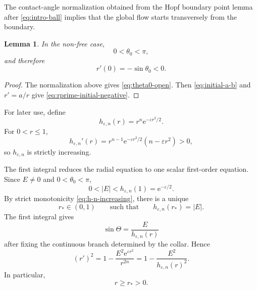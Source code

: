 \documentclass[11pt,a4paper]{article}
\numberwithin{equation}{section}
\newtheorem{lemma}[theorem]{Lemma}
\newcommand{\ee}{\mathrm e}
\begin{document}
The contact-angle normalization obtained from the Hopf boundary point lemma
after \eqref{eq:intro-ball} implies that the global flow starts transversely
from the boundary.

\begin{lemma}\label{lem:no-zero-angle}
In the non-free case,
\begin{equation}\label{eq:theta0-open}
        0<\theta_0<\pi,
\end{equation}
and therefore
\begin{equation}\label{eq:rprime-initial-negative}
        r'(0)=-\sin\theta_0<0.
\end{equation}
\end{lemma}

\begin{proof}
The normalization above gives \eqref{eq:theta0-open}.  Then
\eqref{eq:initial-a-b} and $r'=a/r$ give
\eqref{eq:rprime-initial-negative}.
\end{proof}

For later use, define
\begin{equation*}
        h_{\varepsilon,n}(r)=r^n\ee^{-\varepsilon r^2/2}.
\end{equation*}
For $0<r\le1$,
\begin{equation}\label{eq:h-n-increasing}
        h_{\varepsilon,n}'(r)=r^{n-1}\ee^{-\varepsilon r^2/2}(n-\varepsilon r^2)>0,
\end{equation}
so $h_{\varepsilon,n}$ is strictly increasing.

The first integral reduces the radial equation to one scalar first-order equation.
Since $E\ne0$ and $0<\theta_0<\pi$,
\begin{equation*}
        0<|E|<h_{\varepsilon,n}(1)=\ee^{-\varepsilon/2}.
\end{equation*}
By strict monotonicity \eqref{eq:h-n-increasing}, there is a unique
\begin{equation*}
        r_*\in(0,1)
        \qquad\text{such that}\qquad
        h_{\varepsilon,n}(r_*)=|E|.
\end{equation*}
The first integral gives
\begin{equation*}
        \sin\Theta=\frac{E}{h_{\varepsilon,n}(r)}
\end{equation*}
after fixing the continuous branch determined by the collar.  Hence
\begin{equation}\label{eq:r-first-order}
        (r')^2
        =1-\frac{E^2\ee^{\varepsilon r^2}}{r^{2n}}
        =1-\frac{E^2}{h_{\varepsilon,n}(r)^2}.
\end{equation}
In particular,
\begin{equation*}
        r\ge r_*>0.
\end{equation*}
\end{document}
